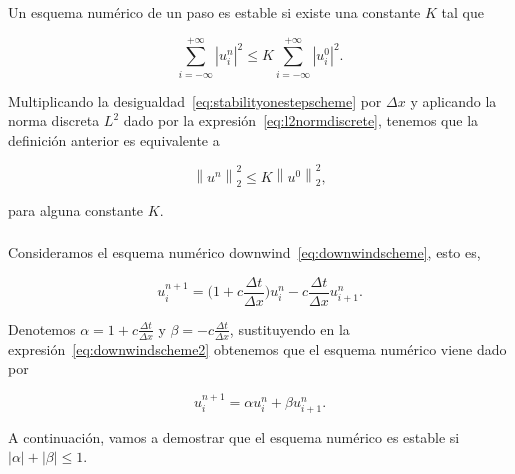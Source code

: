 \begin{frame}
    \frametitle{\secname}

    \begin{definition}
        Un esquema numérico de un paso es estable si existe una constante $K$ tal que

        \begin{equation}\label{eq:stabilityonestepscheme}
            \sum_{i=-\infty}^{+\infty}
            {\left|u^{n}_{i}\right|}^{2}\leq
            K
            \sum_{i=-\infty}^{+\infty}
            {\left|u^{0}_{i}\right|}^{2}.
        \end{equation}
    \end{definition}

    Multiplicando la desigualdad~\eqref{eq:stabilityonestepscheme} por
    $\Delta x$ y aplicando la norma discreta $L^{2}$ dado por la
    expresión~\eqref{eq:l2normdiscrete}, tenemos que la definición
    anterior es equivalente a

    \begin{equation}\label{eq:stabilityonestepschemeequivalence}
        {\left\|u^{n}\right\|}^{2}_{2}\leq
        K
        {\left\|u^{0}\right\|}^{2}_{2},
    \end{equation}

    para alguna constante $K$.
\end{frame}

\begin{frame}
    \frametitle{\secname}
    \begin{example}
        Consideramos el esquema numérico
        downwind~\eqref{eq:downwindscheme}, esto es,

        \begin{equation}\label{eq:downwindscheme2}
            u^{n+1}_{i}=
            \big(
            1+
            c\frac{\Delta t}{\Delta x}
            \big)
            u^{n}_{i}-
            c\frac{\Delta t}{\Delta x}
            u^{n}_{i+1}.
        \end{equation}

        Denotemos
        \begin{math}
            \alpha=
            1+
            c\frac{\Delta t}{\Delta x}
        \end{math}
        y
        \begin{math}
            \beta=
            -c\frac{\Delta t}{\Delta x}
        \end{math},
        sustituyendo en la expresión~\eqref{eq:downwindscheme2} obtenemos
        que el esquema numérico viene dado por

        \begin{equation*}
            u^{n+1}_{i}=
            \alpha u^{n}_{i}+
            \beta u^{n}_{i+1}.
        \end{equation*}

        A continuación, vamos a demostrar que el esquema numérico es
        estable si
        \begin{math}
            \left|\alpha\right|+
            \left|\beta\right|\leq
            1
        \end{math}.
    \end{example}
\end{frame}

